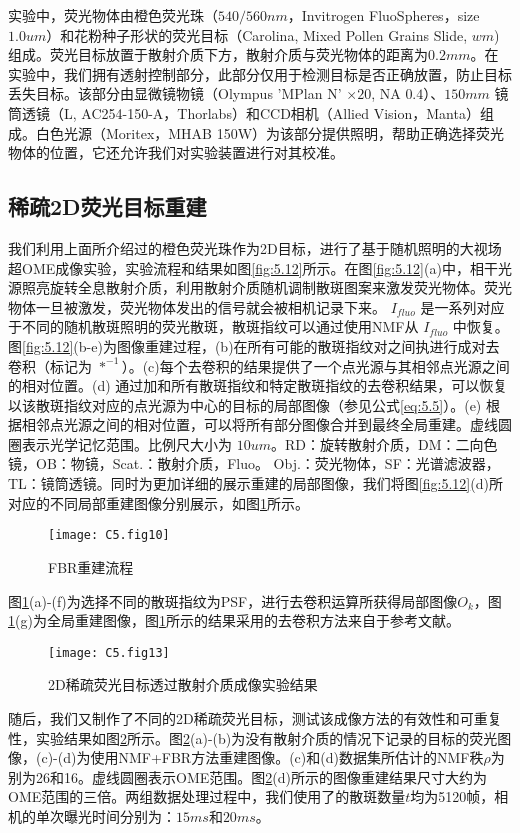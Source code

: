 实验中，荧光物体由橙色荧光珠（$540/560 nm$，Invitrogen FluoSpheres，size $1.0 um$）和花粉种子形状的荧光目标（Carolina, Mixed Pollen Grains Slide, $wm$)组成。荧光目标放置于散射介质下方，散射介质与荧光物体的距离为$0.2 mm$。在实验中，我们拥有透射控制部分，此部分仅用于检测目标是否正确放置，防止目标丢失目标。该部分由显微镜物镜（Olympus 'MPlan N' $\times 20$, NA $0.4$）、$ 150 mm$ 镜筒透镜（L, AC254-150-A，Thorlabs）和CCD相机（Allied Vision，Manta）组成。白色光源（Moritex，MHAB 150W）为该部分提供照明，帮助正确选择荧光物体的位置，它还允许我们对实验装置进行对其校准。
\subsection{稀疏2D荧光目标重建}
我们利用上面所介绍过的橙色荧光珠作为2D目标，进行了基于随机照明的大视场超OME成像实验，实验流程和结果如图\ref{fig:5.12}所示。在图\ref{fig:5.12}(a)中，相干光源照亮旋转全息散射介质，利用散射介质随机调制散斑图案来激发荧光物体。荧光物体一旦被激发，荧光物体发出的信号就会被相机记录下来。 $I_{fluo}$ 是一系列对应于不同的随机散斑照明的荧光散斑，散斑指纹可以通过使用NMF从 $I_{fluo}$ 中恢复。图\ref{fig:5.12}(b-e)为图像重建过程，(b)在所有可能的散斑指纹对之间执进行成对去卷积（标记为 $*^{-1}$）。(c)每个去卷积的结果提供了一个点光源与其相邻点光源之间的相对位置。(d) 通过加和所有散斑指纹和特定散斑指纹的去卷积结果，可以恢复以该散斑指纹对应的点光源为中心的目标的局部图像（参见公式\ref{eq:5.5}）。(e) 根据相邻点光源之间的相对位置，可以将所有部分图像合并到最终全局重建。虚线圆圈表示光学记忆范围。比例尺大小为 $10 um$。RD：旋转散射介质，DM：二向色镜，OB：物镜，Scat.：散射介质，Fluo。 Obj.：荧光物体，SF：光谱滤波器，TL：镜筒透镜。同时为更加详细的展示重建的局部图像，我们将图\ref{fig:5.12}(d)所对应的不同局部重建图像分别展示，如图\ref{fig:5.10}所示。

\begin{figure}[htp]
	\centering
	\texttt{[image: C5.fig10]}
	\caption{FBR重建流程}
	\label{fig:5.10}
\end{figure}

图\ref{fig:5.10}(a)-(f)为选择不同的散斑指纹为PSF，进行去卷积运算所获得局部图像$O_{k}$，图\ref{fig:5.10}(g)为全局重建图像，图\ref{fig:5.10}所示的结果采用的去卷积方法来自于参考文献\cite{Chan2011}。

\begin{figure}[htp]
	\centering
	\texttt{[image: C5.fig13]}
	\caption{2D稀疏荧光目标透过散射介质成像实验结果}
	\label{fig:5.13}
\end{figure}

随后，我们又制作了不同的2D稀疏荧光目标，测试该成像方法的有效性和可重复性，实验结果如图\ref{fig:5.13}所示。图\ref{fig:5.13}(a)-(b)为没有散射介质的情况下记录的目标的荧光图像，(c)-(d)为使用NMF+FBR方法重建图像。(c)和(d)数据集所估计的NMF秩$\rho$为别为26和16。虚线圆圈表示OME范围。图\ref{fig:5.13}(d)所示的图像重建结果尺寸大约为OME范围的三倍。两组数据处理过程中，我们使用了的散斑数量$t$均为5120帧，相机的单次曝光时间分别为：$15ms$和$20 ms$。

